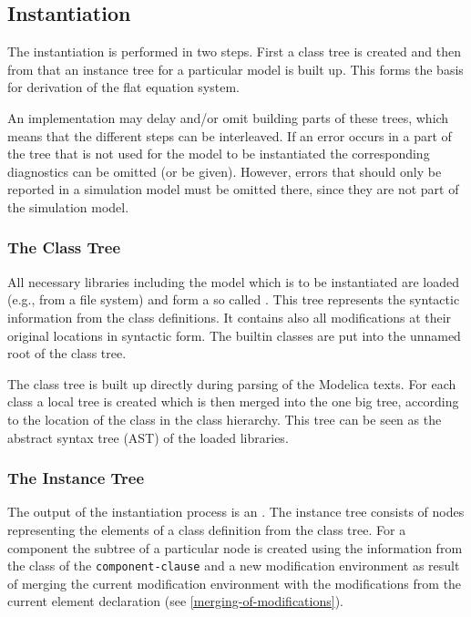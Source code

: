 \subsection{Instantiation}\label{instantiation}

The instantiation is performed in two steps.
First a class tree is created and then from that an instance tree for a particular model is built up.
This forms the basis for derivation of the flat equation system.

An implementation may delay and/or omit building parts of these trees, which means that the different steps can be interleaved.
If an error occurs in a part of the tree that is not used for the model to be instantiated the corresponding diagnostics can be omitted (or be given).
However, errors that should only be reported in a simulation model must be omitted there, since they are not part of the simulation model.


\subsubsection{The Class Tree}\label{the-class-tree}

All necessary libraries including the model which is to be instantiated are loaded (e.g., from a file system) and form a so called .
This tree represents the syntactic information from the class definitions.
It contains also all modifications at their original locations in syntactic form.
The builtin classes are put into the unnamed root of the class tree.

\begin{nonnormative}
The class tree is built up directly during parsing of the Modelica texts.
For each class a local tree is created which is then merged into the one big tree, according to the location of the class in the class hierarchy.
This tree can be seen as the abstract syntax tree (AST) of the loaded libraries.
\end{nonnormative}


\subsubsection{The Instance Tree}\label{the-instance-tree}

The output of the instantiation process is an .
The instance tree consists of nodes representing the elements of a class definition from the class tree.
For a component the subtree of a particular node is created using the information from the class of the \lstinline[language=grammar]!component-clause! and a new modification environment as result of merging the current modification environment with the modifications from the current element declaration (see \cref{merging-of-modifications}).

